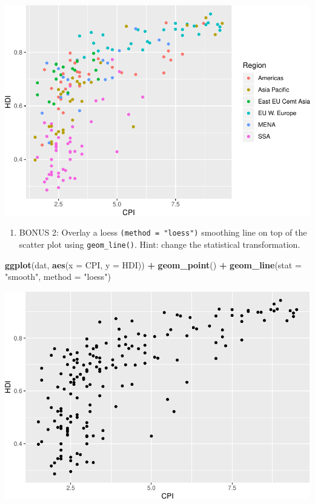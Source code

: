 \documentclass[
]{book}
\newenvironment{Shaded}{\begin{snugshade}}{\end{snugshade}}
\newcommand{\DataTypeTok}[1]{\textcolor[rgb]{0.13,0.29,0.53}{#1}}
\newcommand{\KeywordTok}[1]{\textcolor[rgb]{0.13,0.29,0.53}{\textbf{#1}}}
\newcommand{\NormalTok}[1]{#1}
\newcommand{\OperatorTok}[1]{\textcolor[rgb]{0.81,0.36,0.00}{\textbf{#1}}}
\newcommand{\StringTok}[1]{\textcolor[rgb]{0.31,0.60,0.02}{#1}}
\providecommand{\tightlist}{%
  \setlength{\itemsep}{0pt}\setlength{\parskip}{0pt}}
\begin{document}
\begin{alert}
\includegraphics{R/Rgraphics/figures/unnamed-chunk-196-1.pdf}

\begin{enumerate}
\def\labelenumi{\arabic{enumi}.}
\setcounter{enumi}{5}
\tightlist
\item
  BONUS 2: Overlay a loess \texttt{(method\ =\ "loess")} smoothing line on top of the scatter plot using \texttt{geom\_line()}. Hint: change the statistical transformation.
\end{enumerate}

\begin{Shaded}
\begin{Highlighting}[]
\KeywordTok{ggplot}\NormalTok{(dat, }\KeywordTok{aes}\NormalTok{(}\DataTypeTok{x =}\NormalTok{ CPI, }\DataTypeTok{y =}\NormalTok{ HDI)) }\OperatorTok{+}
\StringTok{  }\KeywordTok{geom\_point}\NormalTok{() }\OperatorTok{+}
\StringTok{  }\KeywordTok{geom\_line}\NormalTok{(}\DataTypeTok{stat =} \StringTok{"smooth"}\NormalTok{, }\DataTypeTok{method =} \StringTok{"loess"}\NormalTok{)}
\end{Highlighting}
\end{Shaded}

\includegraphics{R/Rgraphics/figures/unnamed-chunk-197-1.pdf}

\end{alert}
\end{document}
